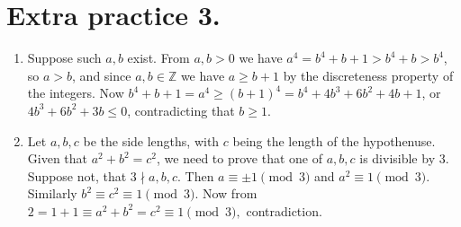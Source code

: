 \documentclass[11pt]{article}
\begin{document}
\section {Extra practice 3.}
\begin{enumerate}
\item Suppose such $a,b$ exist. From $a,b>0$ we have $a^4=b^4+b+1>b^4+b>b^4$, so $a>b$, and since $a,b\in\mathbb{Z}$ we have $a\ge b+1$ by the discreteness property of the integers. Now $b^4+b+1=a^4\ge (b+1)^4=b^4+4b^3+6b^2+4b+1$, or $4b^3+6b^2+3b\le 0$, contradicting that $b\ge 1$.

\item Let $a,b,c$ be the side lengths, with $c$ being the length of the hypothenuse. Given that $a^2+b^2=c^2$, we need to prove that one of $a,b,c$ is divisible by 3. Suppose not, that $3\nmid a, b, c$. Then $a\equiv \pm 1\pmod {3}$ and $a^2\equiv 1\pmod {3}$. Similarly $b^2\equiv c^2\equiv 1\pmod {3}$. Now from $2=1+1\equiv a^2+b^2=c^2\equiv 1\pmod {3},$ contradiction.
\end{enumerate}
\end{document}
